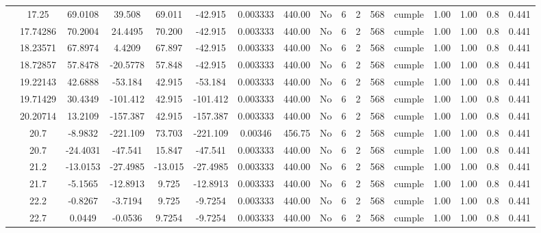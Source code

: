 \begin{table}[H]
{\begin{tabular}{|c|c|c|c|c|c|c|c|c|c|c|c|c|c|c|c|c|}
\cline{2-17}        & 17.25 & 69.0108 & 39.508 & 69.011 & -42.915 & 0.003333 & 440.00 & No  & 6   & 2   & 568 & \cellcolor[rgb]{ .776,  .937,  .808}cumple & 1.00 & 1.00 & 0.8 & 0.441 \bigstrut\\
\cline{2-17}        & 17.74286 & 70.2004 & 24.4495 & 70.200 & -42.915 & 0.003333 & 440.00 & No  & 6   & 2   & 568 & \cellcolor[rgb]{ .776,  .937,  .808}cumple & 1.00 & 1.00 & 0.8 & 0.441 \bigstrut\\
\cline{2-17}        & 18.23571 & 67.8974 & 4.4209 & 67.897 & -42.915 & 0.003333 & 440.00 & No  & 6   & 2   & 568 & \cellcolor[rgb]{ .776,  .937,  .808}cumple & 1.00 & 1.00 & 0.8 & 0.441 \bigstrut\\
\cline{2-17}        & 18.72857 & 57.8478 & -20.5778 & 57.848 & -42.915 & 0.003333 & 440.00 & No  & 6   & 2   & 568 & \cellcolor[rgb]{ .776,  .937,  .808}cumple & 1.00 & 1.00 & 0.8 & 0.441 \bigstrut\\
\cline{2-17}        & 19.22143 & 42.6888 & -53.184 & 42.915 & -53.184 & 0.003333 & 440.00 & No  & 6   & 2   & 568 & \cellcolor[rgb]{ .776,  .937,  .808}cumple & 1.00 & 1.00 & 0.8 & 0.441 \bigstrut\\
\cline{2-17}        & 19.71429 & 30.4349 & -101.412 & 42.915 & -101.412 & 0.003333 & 440.00 & No  & 6   & 2   & 568 & \cellcolor[rgb]{ .776,  .937,  .808}cumple & 1.00 & 1.00 & 0.8 & 0.441 \bigstrut\\
\cline{2-17}        & 20.20714 & 13.2109 & -157.387 & 42.915 & -157.387 & 0.003333 & 440.00 & No  & 6   & 2   & 568 & \cellcolor[rgb]{ .776,  .937,  .808}cumple & 1.00 & 1.00 & 0.8 & 0.441 \bigstrut\\
\cline{2-17}        & \cellcolor[rgb]{ .851,  .882,  .949}20.7 & -8.9832 & -221.109 & 73.703 & -221.109 & 0.00346 & 456.75 & No  & 6   & 2   & 568 & \cellcolor[rgb]{ .776,  .937,  .808}cumple & 1.00 & 1.00 & 0.8 & 0.441 \bigstrut\\
\cline{2-17}        & \cellcolor[rgb]{ .851,  .882,  .949}20.7 & -24.4031 & -47.541 & 15.847 & -47.541 & 0.003333 & 440.00 & No  & 6   & 2   & 568 & \cellcolor[rgb]{ .776,  .937,  .808}cumple & 1.00 & 1.00 & 0.8 & 0.441 \bigstrut\\
\cline{2-17}        & 21.2 & -13.0153 & -27.4985 & -13.015 & -27.4985 & 0.003333 & 440.00 & No  & 6   & 2   & 568 & \cellcolor[rgb]{ .776,  .937,  .808}cumple & 1.00 & 1.00 & 0.8 & 0.441 \bigstrut\\
\cline{2-17}        & 21.7 & -5.1565 & -12.8913 & 9.725 & -12.8913 & 0.003333 & 440.00 & No  & 6   & 2   & 568 & \cellcolor[rgb]{ .776,  .937,  .808}cumple & 1.00 & 1.00 & 0.8 & 0.441 \bigstrut\\
\cline{2-17}        & 22.2 & -0.8267 & -3.7194 & 9.725 & -9.7254 & 0.003333 & 440.00 & No  & 6   & 2   & 568 & \cellcolor[rgb]{ .776,  .937,  .808}cumple & 1.00 & 1.00 & 0.8 & 0.441 \bigstrut\\
\cline{2-17}        & 22.7 & 0.0449 & -0.0536 & 9.7254 & -9.7254 & 0.003333 & 440.00 & No  & 6   & 2   & 568 & \cellcolor[rgb]{ .776,  .937,  .808}cumple & 1.00 & 1.00 & 0.8 & 0.441 \bigstrut\\
    \hline
    \end{tabular}%

}
\end{table}
